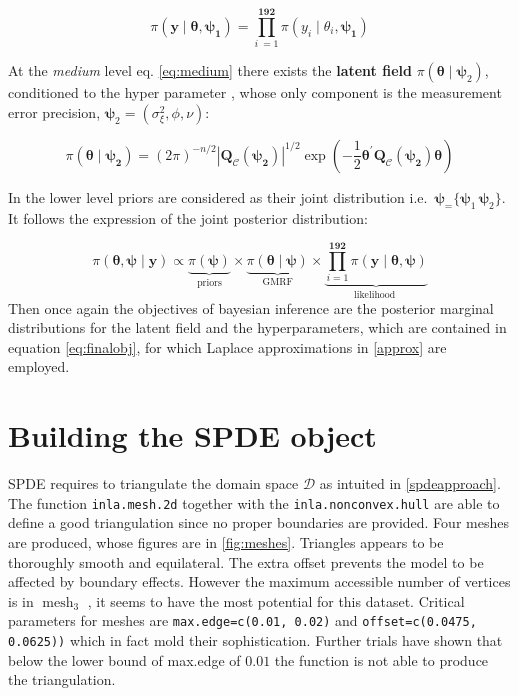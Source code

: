 \documentclass[
  12pt,
  a4paper,
  oneside]{book}
\newcommand{\passthrough}[1]{#1}
\theoremstyle{definition}
\theoremstyle{definition}
\theoremstyle{definition}
\theoremstyle{remark}
\begin{document}
\[\pi(\boldsymbol{\mathbf{y}} \mid \boldsymbol{\theta}, \boldsymbol{\psi_1})=\prod_{i\ = 1}^{\mathbf{192}} \pi\left(y_{i} \mid \theta_{i}, \boldsymbol{\psi_1}\right)\]

At the \emph{medium} level eq. \eqref{eq:medium} there exists the \textbf{latent field} \(\pi(\boldsymbol{\theta} \mid \boldsymbol\psi_2)\), conditioned to the hyper parameter , whose only component is the measurement error precision, \(\boldsymbol\psi_2 = \left(\sigma_{\mathscr{\xi}}^{2}, \phi, \nu\right)\):

\[  \pi(\boldsymbol{\theta} \mid \boldsymbol{\psi_2})=(2 \pi)^{-n / 2}| \boldsymbol{Q_{\mathscr{C}}(\psi_2)}|^{1 / 2} \exp \left(-\frac{1}{2} \boldsymbol{\theta}^{\prime} \boldsymbol{Q_{\mathscr{C}}(\psi_2)} \boldsymbol{\theta}\right)\]

In the lower level priors are considered as their joint distribution i.e.~\(\boldsymbol\psi_ =\{ \boldsymbol\psi_1\, \boldsymbol\psi_2\}\). It follows the expression of the joint posterior distribution:

\[
\pi(\boldsymbol{\theta}, \boldsymbol{\psi} \mid \mathbf{y})\propto  \underbrace{\pi(\boldsymbol{\psi})}_{\text {priors}} \times \underbrace{\pi(\boldsymbol\theta \mid \boldsymbol\psi)}_{\text {GMRF}} \times \underbrace{\prod_{i=1}^{\mathbf{192}} \pi\left(\mathbf{y} \mid \boldsymbol\theta, \boldsymbol{\psi}\right)}_{\text {likelihood }}
\]
Then once again the objectives of bayesian inference are the posterior marginal distributions for the latent field and the hyperparameters, which are contained in equation \eqref{eq:finalobj}, for which Laplace approximations in \ref{approx} are employed.

\hypertarget{spdemodeol}{%
\section{Building the SPDE object}\label{spdemodeol}}

SPDE requires to triangulate the domain space \(\mathscr{D}\) as intuited in \ref{spdeapproach}. The function \passthrough{\lstinline!inla.mesh.2d!} together with the \passthrough{\lstinline!inla.nonconvex.hull!} are able to define a good triangulation since no proper boundaries are provided. Four meshes are produced, whose figures are in \ref{fig:meshes}. Triangles appears to be thoroughly smooth and equilateral. The extra offset prevents the model to be affected by boundary effects. However the maximum accessible number of vertices is in \(\operatorname{mesh}_3\) , it seems to have the most potential for this dataset. Critical parameters for meshes are \passthrough{\lstinline!max.edge=c(0.01, 0.02)!} and \passthrough{\lstinline!offset=c(0.0475, 0.0625))!} which in fact mold their sophistication. Further trials have shown that below the lower bound of max.edge of \(0.01\) the function is not able to produce the triangulation.
\end{document}
